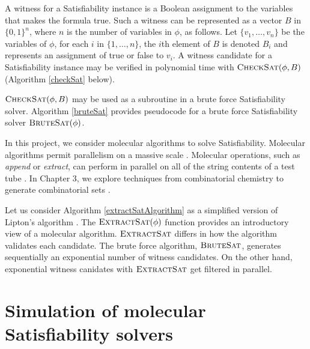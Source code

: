 A witness for a {\sc Satisfiability} instance is a Boolean assignment to the variables that makes the formula true.  Such a witness can be represented as a vector $B$ in $\{0,1\}^n$, where $n$ is the number of variables in $\phi$, as follows.  Let $\{v_1, \ldots , v_n\}$ be the variables of $\phi$, for each $i$ in $\{1, \ldots , n\}$, the $i$th element of $B$ is denoted $B_i$ and represents an assignment of true or false to $v_i$.   A witness candidate for a {\sc Satisfiability} instance may be verified in polynomial time with $\text{\sc CheckSat}(\phi, B)$ (Algorithm \ref{checkSat} below).

\FloatBarrier 



\FloatBarrier 

$\text{\sc CheckSat}(\phi, B)$ may be used as a subroutine in a brute force {\sc Satisfiability} solver.  Algorithm \ref{bruteSat} provides pseudocode for a brute force {\sc Satisfiability} solver $\text{\sc BruteSat}(\phi)$.  

\FloatBarrier 

In this project, we consider molecular algorithms to solve {\sc Satisfiability}.  Molecular algorithms permit parallelism on a massive scale \cite{Adleman:1994:MCS:189441.189442, Lipton95usingdna}.  Molecular operations, such as \textit{append} or \textit{extract}, can perform in parallel on all of the string contents of a test tube \cite{Adleman:1994:MCS:189441.189442, Lipton95usingdna, dnaComputingModels2008}.  In Chapter 3, we explore techniques from combinatorial chemistry to generate combinatorial sets \cite{Lipton95usingdna, furkaBook, dnaComputingModels2008}.




\FloatBarrier 

Let us consider Algorithm \ref{extractSatAlgorithm} as a simplified version of Lipton's algorithm \cite{Lipton95usingdna, dnaComputingModels2008}.  The $\text{\sc ExtractSat}(\phi)$ function provides an introductory view of a molecular algorithm.  $\text{\sc ExtractSat}$ differs in how the algorithm validates each candidate.  The brute force algorithm, $\text{\sc BruteSat}$, generates sequentially an exponential number of witness candidates.  On the other hand, exponential witness canidates with $\text{\sc ExtractSat}$ get filtered in parallel.  
				
\section{Simulation of molecular {\sc Satisfiability} solvers}
	
